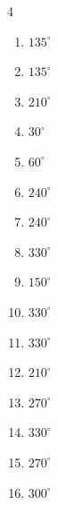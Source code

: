 \begin{multicols}{4}
\begin{enumerate}
  \item $\displaystyle 135^{\circ}$

  \item $\displaystyle 135^{\circ}$

  \item $\displaystyle 210^{\circ}$

  \item $\displaystyle 30^{\circ}$

  \item $\displaystyle 60^{\circ}$

  \item $\displaystyle 240^{\circ}$

  \item $\displaystyle 240^{\circ}$

  \item $\displaystyle 330^{\circ}$

  \item $\displaystyle 150^{\circ}$

  \item $\displaystyle 330^{\circ}$

  \item $\displaystyle 330^{\circ}$

  \item $\displaystyle 210^{\circ}$

  \item $\displaystyle 270^{\circ}$

  \item $\displaystyle 330^{\circ}$

  \item $\displaystyle 270^{\circ}$

  \item $\displaystyle 300^{\circ}$


\end{enumerate}
\end{multicols}
